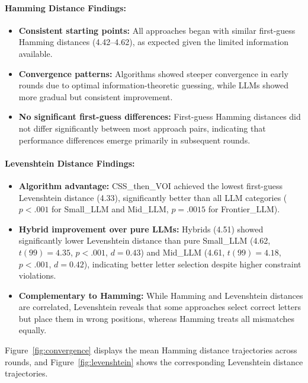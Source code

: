 \paragraph{Hamming Distance Findings:}
\begin{itemize}
    \item \textbf{Consistent starting points:} All approaches began with similar first-guess Hamming distances (4.42--4.62), as expected given the limited information available.
    \item \textbf{Convergence patterns:} Algorithms showed steeper convergence in early rounds due to optimal information-theoretic guessing, while LLMs showed more gradual but consistent improvement.
    \item \textbf{No significant first-guess differences:} First-guess Hamming distances did not differ significantly between most approach pairs, indicating that performance differences emerge primarily in subsequent rounds.
\end{itemize}

\paragraph{Levenshtein Distance Findings:}
\begin{itemize}
    \item \textbf{Algorithm advantage:} CSS\_then\_VOI achieved the lowest first-guess Levenshtein distance (4.33), significantly better than all LLM categories ($p < .001$ for Small\_LLM and Mid\_LLM, $p = .0015$ for Frontier\_LLM).
    \item \textbf{Hybrid improvement over pure LLMs:} Hybrids (4.51) showed significantly lower Levenshtein distance than pure Small\_LLM (4.62, $t(99) = 4.35$, $p < .001$, $d = 0.43$) and Mid\_LLM (4.61, $t(99) = 4.18$, $p < .001$, $d = 0.42$), indicating better letter selection despite higher constraint violations.
    \item \textbf{Complementary to Hamming:} While Hamming and Levenshtein distances are correlated, Levenshtein reveals that some approaches select correct letters but place them in wrong positions, whereas Hamming treats all mismatches equally.
\end{itemize}

Figure~\ref{fig:convergence} displays the mean Hamming distance trajectories across rounds, and Figure~\ref{fig:levenshtein} shows the corresponding Levenshtein distance trajectories.

